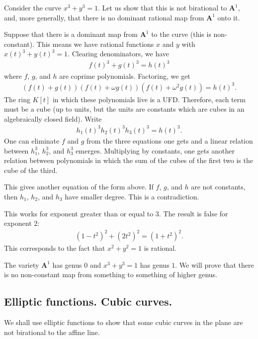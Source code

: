 \documentclass [11 pt, oneside] {article}
\begin{document}
\begin{example}[ ]\label{}
Consider the curve $x^3+y^3=1$. Let us show that this is not birational to $\mathbf{A}^1$, and, more generally, that there is no dominant rational map from $\mathbf{A}^1$ onto it. 

Suppose that there is a dominant map from $\mathbf{A}^1$ to the curve (this is non-constant). This means we have rational functions $x$ and $y$ with $x(t)^3+y (t)^3 =1$. Clearing denominators, we have 
\begin{align*}
	f(t)^3+g (t)^3=h (t)^3
\end{align*}
where $f$, $g$, and $h$ are coprime polynomials. Factoring, we get
\begin{align*}
	(f(t)+g (t)) (f(t)+\omega g (t)) (f(t) + \omega^2g (t)) = h(t)^3.
\end{align*}
The ring $K[t]$ in which these polynomials live is a UFD. Therefore, each term must be a cube (up to units, but the units are constants which are cubes in an algebraically closed field). Write
\begin{align*}
	h_1 (t)^3 h_2(t)^3  h_3(t)^3 = h (t)^3.
\end{align*}
One can eliminate $f$ and $g$ from the three equations one gets and a linear relation between $h_1^3$, $h_2^3$, and $h_3^3$ emerges. Multiplying by constants, one gets another relation between polynomials in which the sum of the cubes of the first two is the cube of the third. 

This gives another equation of the form above. If $f$, $g$, and $h$ are not constants, then $h_1$, $h_2$, and $h_3$ have smaller degree. This is a contradiction.
\end{example}

\begin{remark}
	This works for exponent greater than or equal to $3$. The result is false for exponent $2$:
	\begin{align*}
		(1-t^2)^2 +  (2t^2)^2 =  (1+t^2)^2.
	\end{align*}
	This corresponds to the fact that $x^2+y^2=1$ is rational.
\end{remark}

\begin{remark}
	The variety $\mathbf{A}^1$ has genus $0$ and $x^3+y^3=1$ has genus $1$. We will prove that there is no non-constant map from something to something of higher genus.
\end{remark}

\subsection{Elliptic functions. Cubic curves.}
We shall use elliptic functions to show that some cubic curves in the plane are not birational to the affine line.
\end{document}
